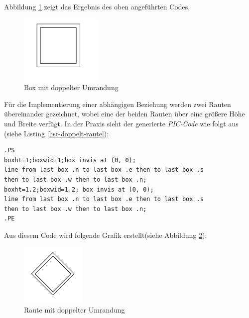 \noindent
Abbildung \ref{Box_doppelt} zeigt das Ergebnis des oben angeführten Codes. 
\\
\begin{figure}[H]
	\begin{center}
		\includegraphics{images/Box_doppelt.png}
		\caption{Box mit doppelter Umrandung}
		\label{Box_doppelt}
	\end{center}
\end{figure}

\noindent
Für die Implementierung einer abhängigen Beziehung werden zwei Rauten übereinander gezeichnet, wobei eine der beiden Rauten über eine größere Höhe und Breite verfügt. In der Praxis sieht der generierte \textit{PIC-Code} wie folgt aus (siehe Listing \ref{list-doppelt-raute}):
\\
\noindent
\lstset{frame=lines}
\lstset{basicstyle=\footnotesize}
\begin{lstlisting}
.PS
boxht=1;boxwid=1;box invis at (0, 0);
line from last box .n to last box .e then to last box .s
then to last box .w then to last box .n;
boxht=1.2;boxwid=1.2; box invis at (0, 0);
line from last box .n to last box .e then to last box .s
then to last box .w then to last box .n;
.PE
\end{lstlisting}

\pra
\noindent
Aus diesem Code wird folgende Grafik erstellt(siehe Abbildung \ref{Raute_doppelt}):
\\

\begin{figure}[H]
	\begin{center}
		\includegraphics{images/Raute_doppelt.png}
		\caption{Raute mit doppelter Umrandung}
		\label{Raute_doppelt}
	\end{center}
\end{figure}


